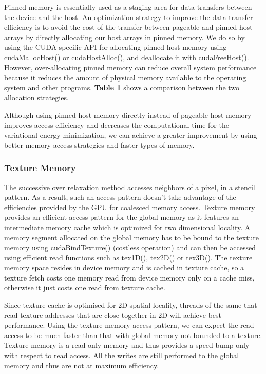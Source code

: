 \documentclass[english]{article}
\begin{document}
	Pinned memory is essentially used as a staging area for data transfers between the device and the host. An optimization strategy to improve the data transfer efficiency is to avoid the cost of the transfer between pageable and pinned host arrays by directly allocating our host arrays in pinned memory. We do so by using the CUDA specific API for allocating pinned host memory using cudaMallocHost() or cudaHostAlloc(), and deallocate it with cudaFreeHost(). However, over-allocating pinned memory can reduce overall system performance because it reduces the amount of physical memory available to the operating system and other programs. \textbf{Table 1} shows a comparison between the two allocation strategies.\newline

	Although using pinned host memory directly instead of pageable host memory improves access efficiency and decreases the computational time for the variational energy minimization, we can achieve a greater improvement by using better memory access strategies and faster types of memory.

	\subsubsection{Texture Memory}
	The successive over relaxation method accesses neighbors of a pixel, in a stencil pattern. As a result, such an access pattern doesn’t take advantage of the efficiencies provided by the GPU for coalesced memory access. Texture memory provides an efficient access pattern for the global memory as it features an intermediate memory cache which is optimized for two dimensional locality. A memory segment allocated on the global memory has to be bound to the texture memory using cudaBindTexture() (costless operation) and can then be accessed using efficient read functions such as tex1D(), tex2D() or tex3D(). The texture memory space resides in device memory and is cached in texture cache, so a texture fetch costs one memory read from device memory only on a cache miss, otherwise it just costs one read from texture cache. 

	Since texture cache is optimised for 2D spatial locality, threads of the same 
	 that read texture addresses that are close together in 2D will achieve best performance. Using the texture memory access pattern, we can expect the read access to be much faster than that with global memory not bounded to a texture. Texture memory is a read-only memory and thus provides a speed bump only with respect to read access. All the writes are still performed to the global memory and thus are not at maximum efficiency. 
\end{document}
